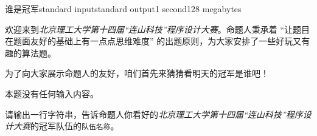 \begin{problem}{谁是冠军}{standard input}{standard output}{1 second}{128 megabytes}

    欢迎来到\textit{北京理工大学第十四届“连山科技”程序设计大赛}。命题人秉承着 “让题目在题面友好的基础上有一点点思维难度” 的出题原则，为大家安排了一些好玩又有趣的算法题。
    
    为了向大家展示命题人的友好，咱们首先来猜猜看明天的冠军是谁吧！

    \InputFile

    本题没有任何输入内容。
    
    \OutputFile
    
    请输出一行字符串，告诉命题人你看好的\textit{北京理工大学第十四届“连山科技”程序设计大赛}的冠军队伍的\texttt{队伍名称}。
    
    \Example
    
    \begin{example}
    \end{example}

\end{problem}